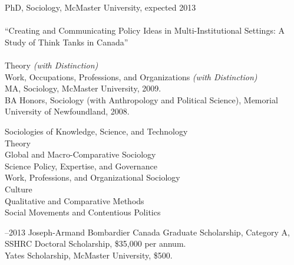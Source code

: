 \documentclass[11pt,usenames,dvipsnames]{article}
\begin{document}
\bigskip

\reversemarginpar

\medskip 

\medskip 
{}

\noindent PhD, Sociology, McMaster University, expected 2013\\ 

\\ 
``Creating and Communicating Policy Ideas in Multi-Institutional Settings: A Study of Think Tanks in Canada''\\

\\
Theory {\it (with Distinction)}\\
Work, Occupations, Professions, and Organizations {\it (with Distinction)}\\

\noindent MA, Sociology, McMaster University, 2009.\\

\noindent BA Honors, Sociology (with Anthropology and Political Science), Memorial University of Newfoundland, 2008.\\



\noindent Sociologies of Knowledge, Science, and Technology\\
Theory\\
Global and Macro-Comparative Sociology \\
Science Policy, Expertise, and Governance \\
Work, Professions, and Organizational Sociology\\ 
Culture \\
Qualitative and Comparative Methods\\ 
Social Movements and Contentious Politics\\



–2013 Joseph-Armand Bombardier Canada Graduate Scholarship, Category A, SSHRC Doctoral Scholarship, \$35,000 per annum.\\

 Yates Scholarship, McMaster University, \$500.\\
\end{document}
